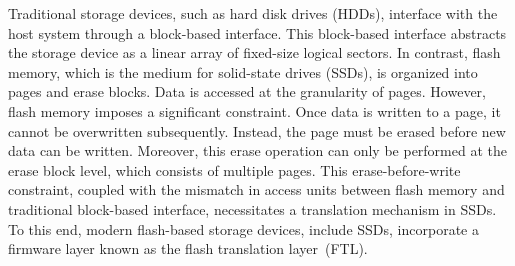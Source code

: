 \begin{comment}
Programs based on the filesystem of a typical operating system recognize disks on a sector basis.
However, in the case of SSDs, storage units are implemented based on pages and blocks.
This means that sector-based programs cannot write directly to SSDs.
Nevertheless, SSDs can easily accommodate these programs because they use the same host interface as HDDs.
To facilitate this, something is needed to assist SSDs in writing for sector-based programs, which is known as the Flash Translation Layer (FTL).

FTL performs two important functions within the SSD: Logical Block Mapping and Garbage Collection (GC).
FTL is responsible for converting logical addresses to physical address values to store logical sectors in physical pages, which is referred to as logical block mapping.
Block mapping is stored in the SSD's memory for quick access and consists of a table containing Logical Block Addresses (LBA) and Physical Block Addresses (PBA).
Additionally, SSDs cannot perform in-place updates.
Therefore, when new data arrives, existing data must be deleted before the new data can be stored.
At this time, the SSD uses GC to preemptively free up space for deleted data, which also contributes to the durability of the SSD.

In this study, we copy and store information from the SSD.
However, accessing the SSD's FTL from the outside is not feasible due to reasons such as security and complexity.
\end{comment}

Traditional storage devices, such as hard disk drives (HDDs), interface with the host system through a block-based interface.
This block-based interface abstracts the storage device as a linear array of fixed-size logical sectors.
In contrast, flash memory, which is the medium for solid-state drives (SSDs), is organized into pages and erase blocks.
Data is accessed at the granularity of pages.
However, flash memory imposes a significant constraint.
Once data is written to a page, it cannot be overwritten subsequently.
Instead, the page must be erased before new data can be written.
Moreover, this erase operation can only be performed at the erase block level, which consists of multiple pages.
This erase-before-write constraint, coupled with the mismatch in access units between flash memory and traditional block-based interface, necessitates a translation mechanism in SSDs.
To this end, modern flash-based storage devices, include SSDs, incorporate a firmware layer known as the flash translation layer~(FTL).


